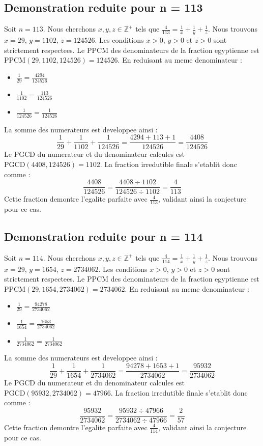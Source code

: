\documentclass[11pt,a4paper]{article}
\begin{document}
\subsection{Demonstration reduite pour n = 113}
Soit $n = 113$. Nous cherchons $x, y, z \in \mathbb{Z}^{+}$ tels que $\frac{4}{113} = \frac{1}{x} + \frac{1}{y} + \frac{1}{z}$.
Nous trouvons $x = 29$, $y = 1102$, $z = 124526$.
Les conditions $x > 0$, $y > 0$ et $z > 0$ sont strictement respectees.
Le PPCM des denominateurs de la fraction egyptienne est $\text{PPCM}(29, 1102, 124526) = 124526$.
En reduisant au meme denominateur :
\begin{itemize}
    \item $\frac{1}{29} = \frac{4294}{124526}$
    \item $\frac{1}{1102} = \frac{113}{124526}$
    \item $\frac{1}{124526} = \frac{1}{124526}$
\end{itemize}
La somme des numerateurs est developpee ainsi :
$$ \frac{1}{29} + \frac{1}{1102} + \frac{1}{124526} = \frac{4294 + 113 + 1}{124526} = \frac{4408}{124526} $$
Le PGCD du numerateur et du denominateur calcules est $\text{PGCD}(4408, 124526) = 1102$.
La fraction irredutible finale s'etablit donc comme :
$$ \frac{4408}{124526} = \frac{4408 \div 1102}{124526 \div 1102} = \frac{4}{113} $$
Cette fraction demontre l'egalite parfaite avec $\frac{4}{113}$, validant ainsi la conjecture pour ce cas.

\subsection{Demonstration reduite pour n = 114}
Soit $n = 114$. Nous cherchons $x, y, z \in \mathbb{Z}^{+}$ tels que $\frac{4}{114} = \frac{1}{x} + \frac{1}{y} + \frac{1}{z}$.
Nous trouvons $x = 29$, $y = 1654$, $z = 2734062$.
Les conditions $x > 0$, $y > 0$ et $z > 0$ sont strictement respectees.
Le PPCM des denominateurs de la fraction egyptienne est $\text{PPCM}(29, 1654, 2734062) = 2734062$.
En reduisant au meme denominateur :
\begin{itemize}
    \item $\frac{1}{29} = \frac{94278}{2734062}$
    \item $\frac{1}{1654} = \frac{1653}{2734062}$
    \item $\frac{1}{2734062} = \frac{1}{2734062}$
\end{itemize}
La somme des numerateurs est developpee ainsi :
$$ \frac{1}{29} + \frac{1}{1654} + \frac{1}{2734062} = \frac{94278 + 1653 + 1}{2734062} = \frac{95932}{2734062} $$
Le PGCD du numerateur et du denominateur calcules est $\text{PGCD}(95932, 2734062) = 47966$.
La fraction irredutible finale s'etablit donc comme :
$$ \frac{95932}{2734062} = \frac{95932 \div 47966}{2734062 \div 47966} = \frac{2}{57} $$
Cette fraction demontre l'egalite parfaite avec $\frac{4}{114}$, validant ainsi la conjecture pour ce cas.
\end{document}
